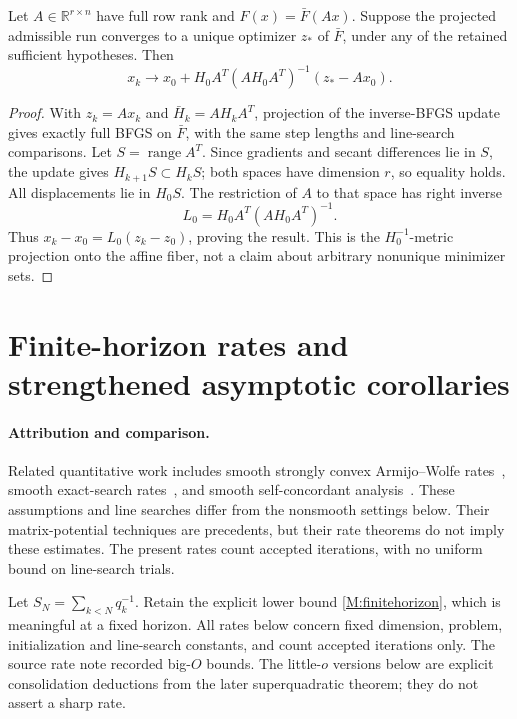 \begin{theorem}\label{F:lifting}
Let $A\in\mathbb R^{r\times n}$ have full row rank and $F(x)=\bar F(Ax)$. Suppose the projected admissible run converges to a unique optimizer $z_*$ of $\bar F$, under any of the retained sufficient hypotheses. Then
\[
 x_k\to x_0+H_0A^T(AH_0A^T)^{-1}(z_*-Ax_0).
\]
\end{theorem}
\begin{proof}
With $z_k=Ax_k$ and $\bar H_k=AH_kA^T$, projection of the inverse-BFGS update gives exactly full BFGS on $\bar F$, with the same step lengths and line-search comparisons. Let $S=\operatorname{range}A^T$. Since gradients and secant differences lie in $S$, the update gives $H_{k+1}S\subset H_kS$; both spaces have dimension $r$, so equality holds. All displacements lie in $H_0S$. The restriction of $A$ to that space has right inverse
\[
 L_0=H_0A^T(AH_0A^T)^{-1}.
\]
Thus $x_k-x_0=L_0(z_k-z_0)$, proving the result. This is the $H_0^{-1}$-metric projection onto the affine fiber, not a claim about arbitrary nonunique minimizer sets.
\end{proof}

\section{Finite-horizon rates and strengthened asymptotic corollaries}
\paragraph{Attribution and comparison.}
Related quantitative work includes smooth strongly convex Armijo--Wolfe rates~\cite{FND_JJM24AW}, smooth exact-search rates~\cite{FND_JJM26EX}, and smooth self-concordant analysis~\cite{FND_JM25}. These assumptions and line searches differ from the nonsmooth settings below. Their matrix-potential techniques are precedents, but their rate theorems do not imply these estimates. The present rates count accepted iterations, with no uniform bound on line-search trials.

Let $S_N=\sum_{k<N}q_k^{-1}$. Retain the explicit lower bound \eqref{M:finitehorizon}, which is meaningful at a fixed horizon. All rates below concern fixed dimension, problem, initialization and line-search constants, and count accepted iterations only. The source rate note recorded big-$O$ bounds. The little-$o$ versions below are explicit consolidation deductions from the later superquadratic theorem; they do not assert a sharp rate.

